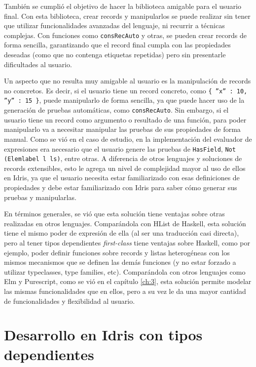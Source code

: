 También se cumplió el objetivo de hacer la biblioteca amigable para el usuario final. Con esta biblioteca, crear records y manipularlos se puede realizar sin tener que utilizar funcionalidades avanzadas del lenguaje, ni recurrir a técnicas complejas. Con funciones como \texttt{consRecAuto} y otras, se pueden crear records de forma sencilla, garantizando que el record final cumpla con las propiedades deseadas (como que no contenga etiquetas repetidas) pero sin presentarle dificultades al usuario.

Un aspecto que no resulta muy amigable al usuario es la manipulación de records no concretos. Es decir, si el usuario tiene un record concreto, como \texttt{\{ ''x'' : 10, ''y'' : 15 \}}, puede manipularlo de forma sencilla, ya que puede hacer uso de la generación de pruebas automáticas, como \texttt{consRecAuto}. Sin embargo, si el usuario tiene un record como argumento o resultado de una función, para poder manipularlo va a necesitar manipular las pruebas de sus propiedades de forma manual. Como se vió en el caso de estudio, en la implementación del evaluador de expresiones era necesario que el usuario genere las pruebas de \texttt{HasField}, \texttt{Not (Elemlabel l ls)}, entre otras. A diferencia de otros lenguajes y soluciones de records extensibles, esto le agrega un nivel de complejidad mayor al uso de ellos en Idris, ya que el usuario necesita estar familiarizado con esas definiciones de propiedades y debe estar familiarizado con Idris para saber cómo generar sus pruebas y manipularlas.

En términos generales, se vió que esta solución tiene ventajas sobre otras realizadas en otros lenguajes. Comparándola con HList de Haskell, esta solución tiene el mismo poder de expresión de ella (al ser una traducción casi directa), pero al tener tipos dependientes \textit{first-class} tiene ventajas sobre Haskell, como por ejemplo, poder definir funciones sobre records y listas heterogéneas con los mismos mecanismos que se definen las demás funciones (y no estar forzado a utilizar typeclasses, type families, etc). Comparándola con otros lenguajes como Elm y Purescript, como se vió en el capítulo \ref{ch:3}, esta solución permite modelar las mismas funcionalidades que en ellos, pero a su vez le da una mayor cantidad de funcionalidades y flexibilidad al usuario.

\section{Desarrollo en Idris con tipos dependientes}

